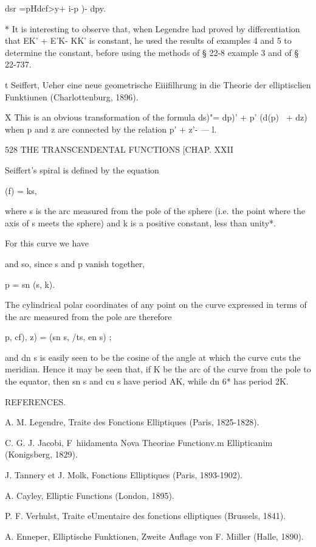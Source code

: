  dsr =pHdcf>y+ i-p )- dpy.

* It is interesting to observe that, when Legendre had proved by
differentiation that EK' + E'K- KK' is constant, he used the results
of examples 4 and 5 to determine the constant, before using the
methods of § 22-8 example 3 and of § 22-737.

t Seiffert, Ueher eine neue geometrische Eiiifilhrung in die Theorie
der elliptisclien Funktiunen (Charlottenburg, 1896).

X This is an obvious transformation of the formula ds)"= dp)' + p'
(d(p)~ + dz) when p and z are connected by the relation p' + z'- — l.



528 THE TRANSCENDENTAL FUNCTIONS [CHAP. XXII

Seiffert's spiral is defined by the equation

(f) = ks,

where s is the arc measured from the pole of the sphere (i.e. the
point where the axis of s meets the sphere) and k is a positive
constant, less than unity*.

For this curve we have

and so, since s and p vanish together,

p = sn (s, k).

The cylindrical polar coordinates of any point on the curve expressed
in terms of the arc measured from the pole are therefore

 p, cf), z) = (sn s, /ts, en s) ;

and dn s is easily seen to be the cosine of the angle at which the
curve cuts the meridian. Hence it may be seen that, if K be the arc of
the curve from the pole to the equator, then sn s and cu s have period
AK, while dn 6* has period 2K.



REFERENCES.

A. M. Legendre, Traite des Fonctions Elliptiques (Paris, 1825-1828).

C. G. J. Jacobi, F\ hiidamenta Nova Theoriae Functionv.m Ellipticanim
(Konigsberg, 1829).

J. Tannery et J. Molk, Fonctions Elliptiques (Paris, 1893-1902).

A. Cayley, Elliptic Functions (London, 1895).

P. F. Verhulst, Traite eUmentaire des fonctions elliptiques (Brussels,
1841).

A. Enneper, Elliptische Funktionen, Zweite Auflage von F. Miiller
(Halle, 1890).

